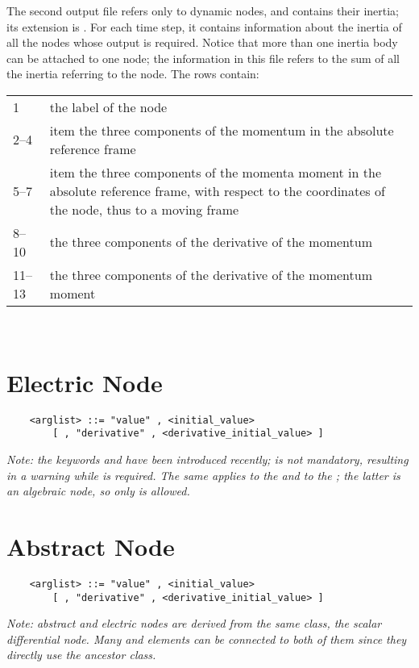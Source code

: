 \noindent
The second output file refers only to dynamic nodes, and contains their
inertia; its extension is .
For each time step, it contains information about the inertia of all the
nodes whose output is required.
Notice that more than one inertia body can be attached to one node; the
information in this file refers to the sum of all the inertia referring to
the node.
The rows contain: \vspace{2mm} \\
\begin{tabular}{lp{140mm}}
        \hline
	1	& the label of the node \\
	2--4	& item the three components of the momentum
		in the absolute reference frame \\
	5--7	& item the three components of the momenta moment
		in the absolute reference frame,
		with respect to the coordinates of the node, 
		thus to a moving frame \\
    	8--10	& the three components of the derivative of the momentum \\
    	11--13	& the three components of the derivative of the momentum moment \\
	\hline
\end{tabular}\vspace{2mm}\\


\section{Electric Node}
\begin{verbatim}
    <arglist> ::= "value" , <initial_value> 
        [ , "derivative" , <derivative_initial_value> ]
\end{verbatim}
\emph{Note: the keywords  and 
have been introduced recently;  is not mandatory,
resulting in a warning while  is required.
The same applies to the  
and to the ; the latter is an algebraic
node, so only  is allowed.
}





\section{Abstract Node}
\begin{verbatim}
    <arglist> ::= "value" , <initial_value>
        [ , "derivative" , <derivative_initial_value> ]
\end{verbatim}
{\em
    Note: abstract and electric nodes are derived from the same class, the
    scalar differential node. Many  and  elements 
    can be connected to both of them since they directly use the ancestor
    class. 
}


